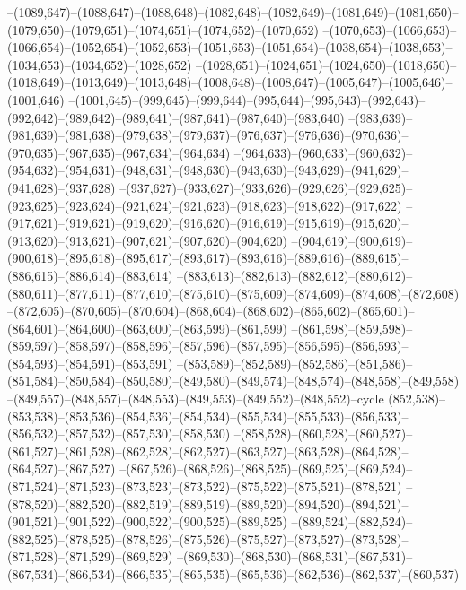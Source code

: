 --(1089,647)--(1088,647)--(1088,648)--(1082,648)--(1082,649)--(1081,649)--(1081,650)--(1079,650)--(1079,651)--(1074,651)--(1074,652)--(1070,652)
--(1070,653)--(1066,653)--(1066,654)--(1052,654)--(1052,653)--(1051,653)--(1051,654)--(1038,654)--(1038,653)--(1034,653)--(1034,652)--(1028,652)
--(1028,651)--(1024,651)--(1024,650)--(1018,650)--(1018,649)--(1013,649)--(1013,648)--(1008,648)--(1008,647)--(1005,647)--(1005,646)--(1001,646)
--(1001,645)--(999,645)--(999,644)--(995,644)--(995,643)--(992,643)--(992,642)--(989,642)--(989,641)--(987,641)--(987,640)--(983,640)
--(983,639)--(981,639)--(981,638)--(979,638)--(979,637)--(976,637)--(976,636)--(970,636)--(970,635)--(967,635)--(967,634)--(964,634)
--(964,633)--(960,633)--(960,632)--(954,632)--(954,631)--(948,631)--(948,630)--(943,630)--(943,629)--(941,629)--(941,628)--(937,628)
--(937,627)--(933,627)--(933,626)--(929,626)--(929,625)--(923,625)--(923,624)--(921,624)--(921,623)--(918,623)--(918,622)--(917,622)
--(917,621)--(919,621)--(919,620)--(916,620)--(916,619)--(915,619)--(915,620)--(913,620)--(913,621)--(907,621)--(907,620)--(904,620)
--(904,619)--(900,619)--(900,618)--(895,618)--(895,617)--(893,617)--(893,616)--(889,616)--(889,615)--(886,615)--(886,614)--(883,614)
--(883,613)--(882,613)--(882,612)--(880,612)--(880,611)--(877,611)--(877,610)--(875,610)--(875,609)--(874,609)--(874,608)--(872,608)
--(872,605)--(870,605)--(870,604)--(868,604)--(868,602)--(865,602)--(865,601)--(864,601)--(864,600)--(863,600)--(863,599)--(861,599)
--(861,598)--(859,598)--(859,597)--(858,597)--(858,596)--(857,596)--(857,595)--(856,595)--(856,593)--(854,593)--(854,591)--(853,591)
--(853,589)--(852,589)--(852,586)--(851,586)--(851,584)--(850,584)--(850,580)--(849,580)--(849,574)--(848,574)--(848,558)--(849,558)
--(849,557)--(848,557)--(848,553)--(849,553)--(849,552)--(848,552)--cycle
(852,538)--(853,538)--(853,536)--(854,536)--(854,534)--(855,534)--(855,533)--(856,533)--(856,532)--(857,532)--(857,530)--(858,530)
--(858,528)--(860,528)--(860,527)--(861,527)--(861,528)--(862,528)--(862,527)--(863,527)--(863,528)--(864,528)--(864,527)--(867,527)
--(867,526)--(868,526)--(868,525)--(869,525)--(869,524)--(871,524)--(871,523)--(873,523)--(873,522)--(875,522)--(875,521)--(878,521)
--(878,520)--(882,520)--(882,519)--(889,519)--(889,520)--(894,520)--(894,521)--(901,521)--(901,522)--(900,522)--(900,525)--(889,525)
--(889,524)--(882,524)--(882,525)--(878,525)--(878,526)--(875,526)--(875,527)--(873,527)--(873,528)--(871,528)--(871,529)--(869,529)
--(869,530)--(868,530)--(868,531)--(867,531)--(867,534)--(866,534)--(866,535)--(865,535)--(865,536)--(862,536)--(862,537)--(860,537)
